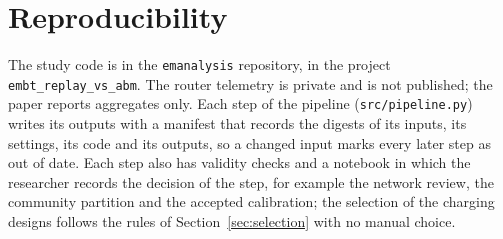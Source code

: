 \begin{table}[htbp]
    \centering
    \footnotesize
    \caption[The best validated Khayelitsha design and three designs above the connector bound]{The best validated Khayelitsha design and three designs above the bound $2\hat{N}_j = (20, 8, 6)$, with 50~kW connectors. \MA: the means over the five selection seeds, and the paired difference to the best design with its standard error. \MR: the stranded share of the vehicle-days and the peak site load.}
    \label{tab:bound_check}
\end{table}

\section{Reproducibility}
\label{app:reproducibility}

The study code is in the \texttt{emanalysis} repository, in the project \texttt{embt\_replay\_vs\_abm}. The router telemetry is private and is not published; the paper reports aggregates only. Each step of the pipeline (\texttt{src/pipeline.py}) writes its outputs with a manifest that records the digests of its inputs, its settings, its code and its outputs, so a changed input marks every later step as out of date. Each step also has validity checks and a notebook in which the researcher records the decision of the step, for example the network review, the community partition and the accepted calibration; the selection of the charging designs follows the rules of Section~\ref{sec:selection} with no manual choice.

